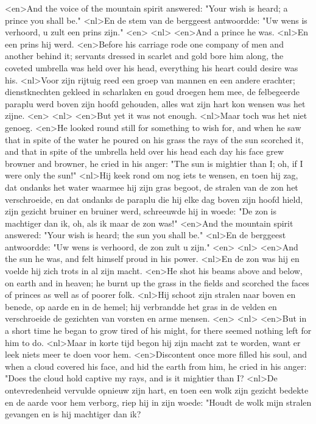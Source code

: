 <en>And the voice of the mountain spirit answered: "Your wish is heard; a prince you shall be."
<nl>En de stem van de berggeest antwoordde: "Uw wens is verhoord, u zult een prins zijn."
<en>
<nl>
<en>And a prince he was.
<nl>En een prins hij werd.
<en>Before his carriage rode one company of men and another behind it; servants dressed in scarlet and gold bore him along, the coveted umbrella was held over his head, everything his heart could desire was his.
<nl>Voor zijn rijtuig reed een groep van mannen en een andere erachter; dienstknechten gekleed in scharlaken en goud droegen hem mee, de felbegeerde paraplu werd boven zijn hoofd gehouden, alles wat zijn hart kon wensen was het zijne.
<en>
<nl>
<en>But yet it was not enough.
<nl>Maar toch was het niet genoeg.
<en>He looked round still for something to wish for, and when he saw that in spite of the water he poured on his grass the rays of the sun scorched it, and that in spite of the umbrella held over his head each day his face grew browner and browner, he cried in his anger: "The sun is mightier than I; oh, if I were only the sun!"
<nl>Hij keek rond  om nog iets te wensen, en toen hij zag, dat ondanks het water waarmee hij zijn gras begoot, de stralen van de zon het verschroeide, en dat ondanks de paraplu die hij elke dag boven zijn hoofd hield, zijn gezicht bruiner en bruiner werd, schreeuwde hij in woede: "De zon is machtiger dan ik, oh, als ik maar de zon was!"
<en>And the mountain spirit answered: "Your wish is heard; the sun you shall be."
<nl>En de berggeest antwoordde: "Uw wens is verhoord, de zon zult u zijn."
<en>
<nl>
<en>And the sun he was, and felt himself proud in his power.
<nl>En de zon was hij en voelde hij zich trots in  al zijn macht.
<en>He shot his beams above and below, on earth and in heaven; he burnt up the grass in the fields and scorched the faces of princes as well as of poorer folk.
<nl>Hij schoot zijn stralen naar boven en benede, op aarde en in de hemel; hij verbrandde het gras in de velden en verschroeide de gezichten van vorsten en arme mensen.
<en>
<nl>
<en>But in a short time he began to grow tired of his might, for there seemed nothing left for him to do.
<nl>Maar in korte tijd begon hij zijn macht zat te worden, want er leek niets meer te doen voor hem.
<en>Discontent once more filled his soul, and when a cloud covered his face, and hid the earth from him, he cried in his anger: "Does the cloud hold captive my rays, and is it mightier than I?
<nl>De ontevredenheid vervulde opnieuw zijn hart, en toen een wolk zijn gezicht bedekte en de aarde voor hem verborg, riep hij in zijn woede: "Houdt de wolk mijn stralen gevangen en is hij machtiger dan ik?
